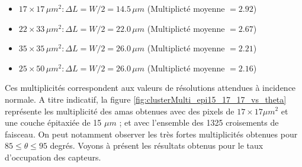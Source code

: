   \medskip
  
  \renewcommand{\labelitemi}{$\bullet$}
  \begin{itemize}
   \item $17 \times 17 \, \mu m^2 : \Delta L = W/2 = 14.5 \, \mu m$ (Multiplict\'e moyenne $= 2.92$)
   \item $22 \times 33 \, \mu m^2 : \Delta L = W/2 = 22.0 \, \mu m$ (Multiplict\'e moyenne $= 2.67$)
   \item $35 \times 35 \, \mu m^2 : \Delta L = W/2 = 26.0 \, \mu m$ (Multiplict\'e moyenne $= 2.21$)
   \item $25 \times 50 \, \mu m^2 : \Delta L = W/2 = 26.0 \, \mu m$ (Multiplict\'e moyenne $= 2.16$)
  \end{itemize}
  
  \medskip
  
  Ces multiplicit\'es correspondent aux valeurs de r\'esolutions attendues \`a incidence normale. A titre indicatif, la figure \ref{fig:clusterMulti_epi15_17_17_vs_theta} repr\'esente les multiplicit\'e des amas obtenues avec des pixels de $17 \times 17 \mu m^2$ et une couche \'epitaxi\'ee de 15 $\mu m$ ; et avec l'ensemble des 1325 croisements de faisceau. On peut notamment observer les tr\`es fortes multiplicit\'es obtenues pour $85 \leq \theta \leq 95$ degr\'es. Voyons \`a pr\'esent les r\'esultats obtenus pour le taux d'occupation des capteurs.

  
  \FloatBarrier
  
